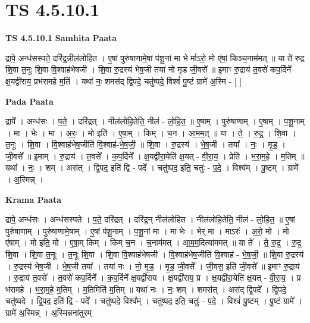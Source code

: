 \documentclass[17pt]{extarticle}
\begin{document}
\section{ TS 4.5.10.1 }

\textbf{TS 4.5.10.1 } \newline
\textbf{Samhita Paata} \newline

द्रापे॒ अन्ध॑सस्पते॒ दरि॑द्र॒न्नील॑लोहित । ए॒षां पुरु॑षाणामे॒षां प॑शू॒नां मा भे र्माऽरो॒ मो ए॑षां॒ किञ्च॒नाम॑मत् ॥ या ते॑ रुद्र शि॒वा त॒नूः शि॒वा वि॒श्वाह॑भेषजी । शि॒वा रु॒द्रस्य॑ भेष॒जी तया॑ नो मृड जी॒वसे᳚ ॥                                    इ॒माꣳ रु॒द्राय॑ त॒वसे॑ कप॒र्दिने᳚ क्ष॒यद्वी॑राय॒ प्रभ॑रामहे म॒तिं । यथा॑ नः॒ शमस॑द् द्वि॒पदे॒ चतु॑ष्पदे॒ विश्वं॑ पु॒ष्टं ग्रामे॑ अ॒स्मि - [  ] \newline

\textbf{Pada Paata} \newline

द्रापे᳚ । अन्ध॑सः । प॒ते॒ । दरि॑द्रत् । नील॑लोहि॒तेति॒ नील॑ - लो॒हि॒त॒ ॥ ए॒षाम् । पुरु॑षाणाम् । ए॒षाम् । प॒शू॒नाम् । मा । भेः । मा । अ॒रः॒ । मो इति॑ । ए॒षा॒म् । किम् । च॒न । आ॒म॒म॒त् ॥ या । ते॒ । रु॒द्र॒ । शि॒वा । त॒नूः । शि॒वा । वि॒श्वाह॑भेष॒जीति॑ वि॒श्वाह॑-भे॒ष॒जी॒ ॥ शि॒वा । रु॒द्रस्य॑ । भे॒ष॒जी । तया᳚ । नः॒ । मृ॒ड॒ । जी॒वसे᳚ ॥ इ॒माम् । रु॒द्राय॑ । त॒वसे᳚ । क॒प॒र्दिने᳚ । क्ष॒यद्वी॑रा॒येति॑ क्ष॒यत् - वी॒रा॒य॒ । प्रेति॑ । भ॒रा॒म॒हे॒ । म॒तिम् ॥ यथा᳚ । नः॒ । शम् । अस॑त् । द्वि॒पद॒ इति॑ द्वि - पदे᳚ । चतु॑ष्पद॒ इति॒ चतुः॑ - प॒दे॒ । विश्व᳚म् । पु॒ष्टम् । ग्रामे᳚ । अ॒स्मिन्न् ।  \newline


\textbf{Krama Paata} \newline

द्रापे॒ अन्ध॑सः । अन्ध॑सस्पते । प॒ते॒ दरि॑द्रत् । दरि॑द्र॒न् नील॑लोहित । नील॑लोहि॒तेति॒ नील॑ - लो॒हि॒त॒ ॥ ए॒षां पुरु॑षाणाम् । पुरु॑षाणामे॒षाम् । ए॒षां प॑शू॒नाम् । प॒शू॒नां मा । मा भेः । भेर् मा । माऽरः॑ । अ॒रो॒ मो । मो ए॑षाम् । मो इति॒ मो । ए॒षा॒म् किम् । किम् च॒न । च॒नाम॑मत् । आ॒म॒म॒दित्या॑ममत् ॥ या ते᳚ । ते॒ रु॒द्र॒ । रु॒द्र॒ शि॒वा । शि॒वा त॒नूः । त॒नूः शि॒वा । शि॒वा वि॒श्वाह॑भेषजी । वि॒श्वाह॑भेष॒जीति॑ वि॒श्वाह॑ - भे॒ष॒जी॒ ॥ शि॒वा रु॒द्रस्य॑ । रु॒द्रस्य॑ भेष॒जी । भे॒ष॒जी तया᳚ । तया॑ नः । नो॒ मृ॒ड॒ । मृ॒ड॒ जी॒वसे᳚ । जी॒वस॒ इति॑ जी॒वसे᳚ ॥ इ॒माꣳ रु॒द्राय॑ । रु॒द्राय॑ त॒वसे᳚ । त॒वसे॑ कप॒र्दिने᳚ । क॒प॒र्दिने᳚ क्ष॒यद्वी॑राय । क्ष॒यद्वी॑राय॒ प्र । क्ष॒यद्वी॑रा॒येति॑ क्ष॒यत् - वी॒रा॒य॒ । प्र भ॑रामहे । भ॒रा॒म॒हे॒ म॒तिम् । म॒तिमिति॑ म॒तिम् ॥ यथा॑ नः । नः॒ शम् । शमस॑त् । अस॑द् द्वि॒पदे᳚ । द्वि॒पदे॒ चतु॑ष्पदे । द्वि॒पद॒ इति॑ द्वि - पदे᳚ । चतु॑ष्पदे॒ विश्व᳚म् । चतु॑ष्पद॒ इति॒ चतुः॑ - प॒दे॒ । विश्वं॑ पु॒ष्टम् । पु॒ष्टं ग्रामे᳚ । ग्रामे॑ अ॒स्मिन्न् । अ॒स्मिन्नना॑तुरम् \newline
\end{document}
